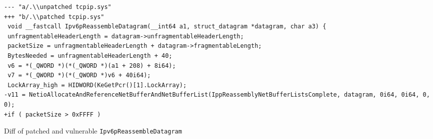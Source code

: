 \documentclass{report}
\begin{document}
\begin{listing}[H]
    \begin{verbatim}
--- "a/.\\unpatched tcpip.sys"
+++ "b/.\\patched tcpip.sys"
 void __fastcall Ipv6pReassembleDatagram(__int64 a1, struct_datagram *datagram, char a3) {
 unfragmentableHeaderLength = datagram->unfragmentableHeaderLength;
 packetSize = unfragmentableHeaderLength + datagram->fragmentableLength;
 BytesNeeded = unfragmentableHeaderLength + 40;
 v6 = *(_QWORD *)(*(_QWORD *)(a1 + 208) + 8i64);
 v7 = *(_QWORD *)(*(_QWORD *)v6 + 40i64);
 LockArray_high = HIDWORD(KeGetPcr()[1].LockArray);
-v11 = NetioAllocateAndReferenceNetBufferAndNetBufferList(IppReassemblyNetBufferListsComplete, datagram, 0i64, 0i64, 0, 0);
+if ( packetSize > 0xFFFF )
\end{verbatim}
\caption{Diff of patched and vulnerable \texttt{Ipv6pReassembleDatagram}}
\label{listing:diff:Ipv6pReassembleDatagram-c}
\end{listing}
\end{document}
